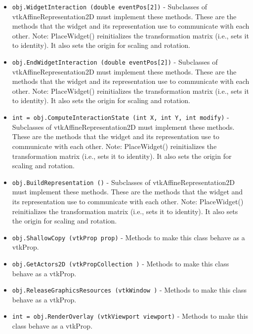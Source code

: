\begin{itemize}
\item  \verb|obj.WidgetInteraction (double eventPos[2])| -  Subclasses of vtkAffineRepresentation2D must implement these methods. These
 are the methods that the widget and its representation use to
 communicate with each other. Note: PlaceWidget() reinitializes the 
 transformation matrix (i.e., sets it to identity). It also sets the
 origin for scaling and rotation.

\item  \verb|obj.EndWidgetInteraction (double eventPos[2])| -  Subclasses of vtkAffineRepresentation2D must implement these methods. These
 are the methods that the widget and its representation use to
 communicate with each other. Note: PlaceWidget() reinitializes the 
 transformation matrix (i.e., sets it to identity). It also sets the
 origin for scaling and rotation.

\item  \verb|int = obj.ComputeInteractionState (int X, int Y, int modify)| -  Subclasses of vtkAffineRepresentation2D must implement these methods. These
 are the methods that the widget and its representation use to
 communicate with each other. Note: PlaceWidget() reinitializes the 
 transformation matrix (i.e., sets it to identity). It also sets the
 origin for scaling and rotation.

\item  \verb|obj.BuildRepresentation ()| -  Subclasses of vtkAffineRepresentation2D must implement these methods. These
 are the methods that the widget and its representation use to
 communicate with each other. Note: PlaceWidget() reinitializes the 
 transformation matrix (i.e., sets it to identity). It also sets the
 origin for scaling and rotation.

\item  \verb|obj.ShallowCopy (vtkProp prop)| -  Methods to make this class behave as a vtkProp.

\item  \verb|obj.GetActors2D (vtkPropCollection )| -  Methods to make this class behave as a vtkProp.

\item  \verb|obj.ReleaseGraphicsResources (vtkWindow )| -  Methods to make this class behave as a vtkProp.

\item  \verb|int = obj.RenderOverlay (vtkViewport viewport)| -  Methods to make this class behave as a vtkProp.

\end{itemize}
